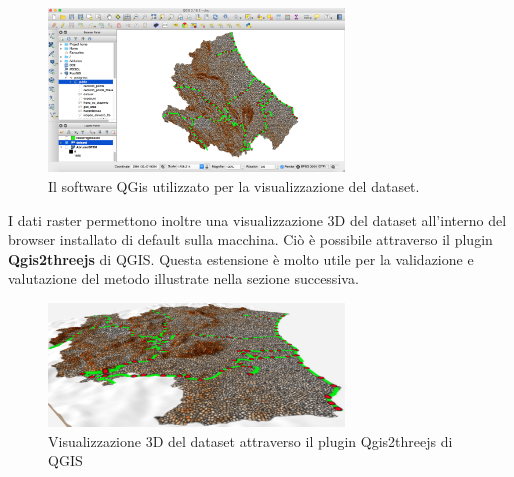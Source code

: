 \begin{figure}[h]
	\centering
	\includegraphics[width=0.7\textwidth]{images/QGIS}
	\caption{Il software QGis utilizzato per la visualizzazione del dataset.}
	\label{qgis}
\end{figure}

I dati raster permettono inoltre una visualizzazione 3D del dataset all'interno del browser installato di default sulla macchina. Ciò è possibile attraverso il plugin \textbf{Qgis2threejs} di QGIS. Questa estensione è molto utile per la validazione e valutazione del metodo illustrate nella sezione successiva.

\begin{figure}[h]
	\centering
	\includegraphics[width=0.7\textwidth]{images/Threejs}
	\caption{Visualizzazione 3D del dataset attraverso il plugin Qgis2threejs di QGIS}
	\label{threejs}
\end{figure}